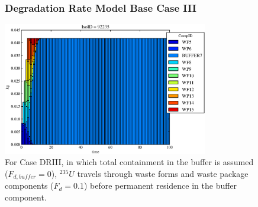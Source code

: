 %
%  
%
%
%
%
%
\begin{frame}[ctb!]
\begin{figure}[ht]
  \frametitle{Degradation Rate Model Base Case III}
\centering
\includegraphics[width=0.8\textwidth]{./images/drIII.eps}
\caption[$^{235}U$ residence. Degradation Rate Buffer No Release.]{
For Case DRIII, in which total containment in the buffer is assumed ($F_{d,buffer}=0$), 
$^{235}U$ travels through waste forms and waste package components ($F_d = 0.1$) before 
permanent residence in the buffer component.
}
\label{fig:drIIIall}
\end{figure}
\end{frame}

